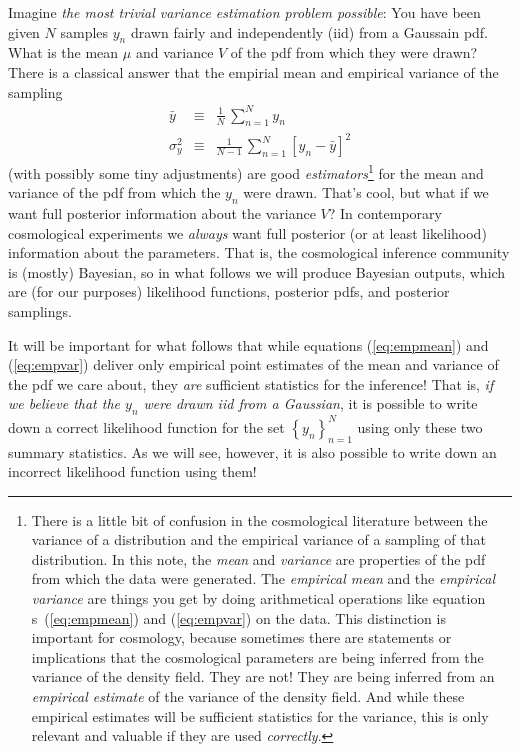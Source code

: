 \documentclass[12pt, letterpaper, preprint]{aastex}
\newcommand{\setof}[1]{\left\{{#1}\right\}}
\newcommand{\documentname}{note}
\newcommand{\equationname}{equation}
\begin{document}
Imagine \emph{the most trivial variance estimation problem possible}:
You have been given $N$ samples $y_n$ drawn fairly and independently (iid)
from a Gaussain pdf.
What is the mean $\mu$ and variance $V$ of the pdf from which they
were drawn?
There is a classical answer that the empirial mean and empirical
variance of the sampling
\begin{eqnarray}
\bar{y} &\equiv& \frac{1}{N}\,\sum_{n=1}^N y_n
\label{eq:empmean}\\
\sigma^2_y &\equiv& \frac{1}{N-1}\,\sum_{n=1}^N [y_n - \bar{y}]^2
\label{eq:empvar}
\end{eqnarray}
(with possibly some tiny adjustments) are good
\emph{estimators}\footnote{There is a little bit of confusion in the
  cosmological literature between the variance of a distribution and
  the empirical variance of a sampling of that distribution. In this
  \documentname, the \emph{mean} and \emph{variance} are properties of
  the pdf from which the data were generated. The \emph{empirical
    mean} and the \emph{empirical variance} are things you get by
  doing arithmetical operations like \equationname
  s~(\ref{eq:empmean}) and (\ref{eq:empvar}) on the data.  This
  distinction is important for cosmology, because sometimes there are
  statements or implications that the cosmological parameters are
  being inferred from the variance of the density field. They are not!
  They are being inferred from an \emph{empirical estimate} of the
  variance of the density field. And while these empirical estimates
  will be sufficient statistics for the variance,
  this is only relevant and valuable if
  they are used \emph{correctly}.} for the mean and variance of the
pdf from which the $y_n$ were drawn.
That's cool, but what if we want full posterior information about the
variance $V$?
In contemporary cosmological experiments we \emph{always} want full
posterior (or at least likelihood) information about the parameters.
That is, the cosmological inference community is (mostly) Bayesian,
so in what follows we will produce Bayesian outputs, which are (for
our purposes) likelihood functions, posterior pdfs, and posterior
samplings.

It will be important for what follows that while equations
(\ref{eq:empmean}) and (\ref{eq:empvar}) deliver only empirical
point estimates of the mean and variance of the pdf we care about,
they \emph{are} sufficient statistics for the inference!
That is, \emph{if we believe that the $y_n$ were drawn iid from a
  Gaussian}, it is possible to write down a correct likelihood
function for the set $\setof{y_n}_{n=1}^N$ using only these two
summary statistics.
As we will see, however, it is also possible to write down an
incorrect likelihood function using them!
\end{document}
